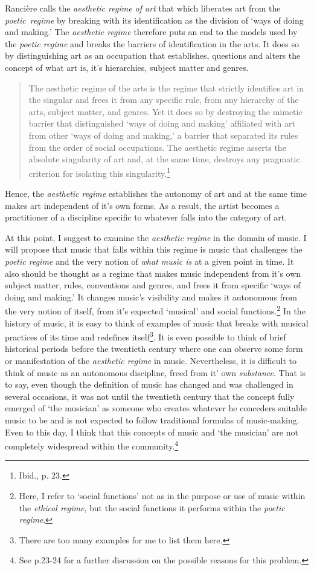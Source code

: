 Ranci\`{e}re calls the \emph{aesthetic regime of art} that which liberates art from the \mbox{\emph{poetic regime}} by breaking with its identification as the division of `ways of doing and making.' The \emph{aesthetic regime} therefore puts an end to the models used by the \emph{poetic regime} and breaks the barriers of identification in the arts. It does so by distinguishing art as an occupation that establishes, questions and alters the concept of what art is, it's hierarchies, subject matter and genres. 
\begin{quote}
The aesthetic regime of the arts is the regime that strictly identifies art in the singular and frees it from any specific rule, from any hierarchy of the arts, subject matter, and genres. Yet it does so by destroying the mimetic barrier that distinguished `ways of doing and making' affiliated with art from other `ways of doing and making,' a barrier that separated its rules from the order of social occupations. The aesthetic regime asserts the absolute singularity of art and, at the same time, destroys any pragmatic criterion for isolating this singularity.\footnote{Ibid., p. 23.}
\end{quote}
Hence, the \emph{aesthetic regime} establishes the autonomy of art and at the same time makes art independent of it's own forms. As a result, the artist becomes a practitioner of a discipline specific to whatever falls into the category of art. 

At this point, I suggest to examine the \emph{aesthetic regime} in the domain of music. I will propose that music that falls within this regime is music that challenges the \emph{poetic regime} and the very notion of \emph{what music is} at a given point in time. It also should be thought as a regime that makes music independent from it's own subject matter, rules, conventions and genres, and frees it from specific `ways of doing and making.' It changes music's visibility and makes it autonomous from the very notion of itself, from it's expected `musical' and social functions.\footnote{Here, I refer to `social functions' not as in the purpose or use of music within the \emph{ethical regime}, but the social functions it performs within the \emph{poetic regime}.} In the history of music, it is easy to think of examples of music that breaks with musical practices of its time and redefines itself\footnote{There are too many examples for me to list them here.}. It is even possible to think of brief historical periods before the twentieth century where one can observe some form or manifestation of the \emph{aesthetic regime} in music. Nevertheless, it is difficult to think of music as an autonomous discipline, freed from it' own \emph{substance}. That is to say, even though the definition of music has changed and was challenged in several occasions, it was not until the twentieth century that the concept fully emerged of `the musician' as someone who creates whatever he conceders suitable music to be and is not expected to follow traditional formulas of music-making. Even to this day, I think that this concepts of music and `the musician' are not completely widespread within the community.\footnote{See p.23-24 for a further discussion on the possible reasons for this problem.}

